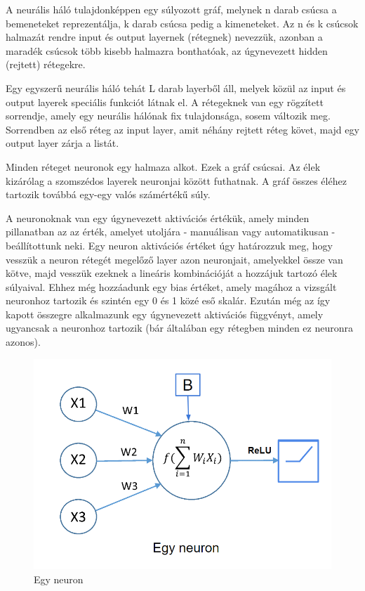 \documentclass[12pt]{article}
\begin{document}
A neurális háló tulajdonképpen egy súlyozott gráf, melynek n darab csúcsa a bemeneteket reprezentálja, k darab csúcsa pedig a kimeneteket. Az n és k csúcsok halmazát rendre input és output layernek (rétegnek) nevezzük, azonban a maradék csúcsok több kisebb halmazra bonthatóak, az úgynevezett hidden (rejtett) rétegekre. 

Egy egyszerű neurális háló tehát L darab layerből áll, melyek közül az input és output layerek speciális funkciót látnak el. A rétegeknek van egy rögzített sorrendje, amely egy neurális hálónak fix tulajdonsága, sosem változik meg. Sorrendben az első réteg az input layer, amit néhány rejtett réteg követ, majd egy output layer zárja a listát.

Minden réteget neuronok egy halmaza alkot. Ezek a gráf csúcsai. Az élek kizárólag a szomszédos layerek neuronjai között futhatnak. A gráf összes éléhez tartozik továbbá egy-egy valós számértékű súly.

A neuronoknak van egy úgynevezett aktivációs értékük, amely minden pillanatban az az érték, amelyet utoljára - manuálisan vagy automatikusan - beállítottunk neki. Egy neuron aktivációs értéket úgy határozzuk meg, hogy vesszük a neuron rétegét megelőző layer azon neuronjait, amelyekkel össze van kötve, majd vesszük ezeknek a lineáris kombinációját a hozzájuk tartozó élek súlyaival. Ehhez még hozzáadunk egy bias értéket, amely magához a vizsgált neuronhoz tartozik és szintén egy 0 és 1 közé eső skalár.
Ezután még az így kapott összegre alkalmazunk egy úgynevezett aktivációs függvényt, amely ugyancsak a neuronhoz tartozik (bár általában egy rétegben minden ez neuronra azonos).

\begin{figure}[h!]
  \includegraphics[width=\linewidth]{neuron.png}
  \caption{Egy neuron}
\end{figure}
\end{document}
